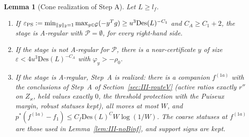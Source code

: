 \documentclass[10pt]{amsart}
\newtheorem{lemma}[theorem]{Lemma}
\theoremstyle{definition}
\theoremstyle{remark}
\begin{document}
\begin{lemma}[Cone realization of Step A]\label{lem:III-cone}
Let $L\ge l_f$.
\begin{enumerate}
\item[(a)] If $\varepsilon_{\rm PS}:=\min_{\|y\|_2=1}\max_{g\in\mathcal G}(-y^Tg)\ge
u^3\mathrm{Des}(L)^{-C_1}$ and $C_A\ge C_1+2$, the stage is A-regular with
$\mathcal P=\emptyset$, for every right-hand side.
\item[(b)] If the stage is not A-regular for $\mathcal P$, there is a
near-certificate $y$ of size $\varepsilon<4u^3\mathrm{Des}(L)^{-C_A}$ with
$\varphi_y>-\rho_0$.
\item[(c)] If the stage is A-regular, Step~A is realized: there is a companion
$f^{(1a)}$ with the conclusions of Step~A of Section~\textup{\ref{sec:III-routeV}}
\textup{(}active ratios exactly $r''$ on $Z_\varkappa$, held values exactly
$0$, the threshold protection with the Puiseux margin, robust statuses
kept\textup{)}, all moves at most $W$, and $p^*(f^{(1a)}-f_1)\le
C_f\mathrm{Des}(L)^CW\log(1/W)$.  The coarse statuses at $f^{(1a)}$ are those
used in Lemma~\textup{\ref{lem:III-noBinf}}, and support signs are kept.
\end{enumerate}
\end{lemma}
\end{document}
